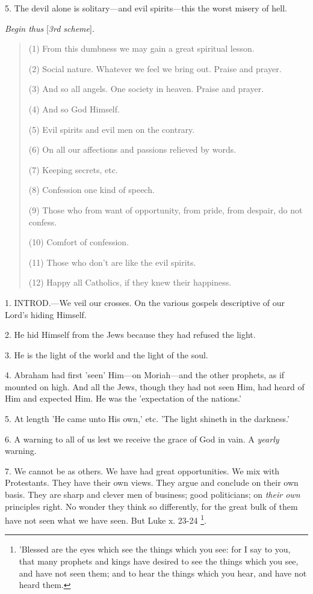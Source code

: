 5. The devil alone is solitary—and evil
spirits—this the worst misery of hell.

\emph{Begin thus} [\emph{3rd scheme}].

\begin{quote}

(1) From this dumbness we may gain a great
spiritual lesson.

(2) Social nature. Whatever we feel we bring out. Praise and prayer.

(3) And so all angels. One society in heaven. Praise and prayer.

(4) And so God Himself.

(5) Evil spirits and evil men on the contrary.

(6) On all our affections and passions relieved by words.

(7) Keeping secrets, etc.

(8) Confession one kind of speech.

(9) Those who from want of opportunity, from pride, from despair, do
not confess.

(10) Comfort of confession.

(11) Those who don't are like the evil spirits.

(12) Happy all Catholics, if they knew their happiness.

\end{quote}


1. INTROD.—We
veil our crosses. On the various gospels descriptive of our Lord's
hiding Himself.

2. He hid Himself from the Jews because they had
refused the light.

3. He is the light of the world and the light of
the soul.

4. Abraham had first 'seen' Him—on Moriah—and
the other prophets, as if mounted on high. And all the Jews, though
they had not seen Him, had heard of Him and expected Him. He was the
'expectation of the nations.'

5. At length 'He came unto His own,' etc. 'The
light shineth in the darkness.'

6. A warning to all of us lest we receive the
grace of God in vain. A \emph{yearly} warning.

7. We cannot be as others. We have had great
opportunities. We mix with Protestants. They have their own
views. They argue and conclude on their own basis. They are sharp and
clever men of business; good politicians; on \emph{their own}
principles right. No wonder they think so differently, for the great
bulk of them have not seen what we have seen. But Luke x. 23-24 \footnote{'Blessed are the eyes
which see the things which you see: for I say to you, that many
prophets and kings have desired to see the things which you see, and
have not seen them; and to hear the things which you hear, and have
not heard them.}.

